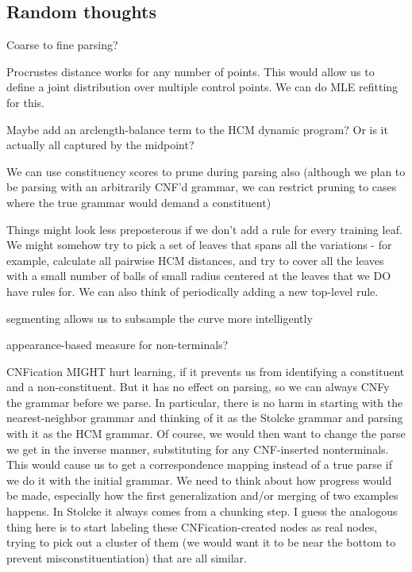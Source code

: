 \documentclass{article}
\begin{document}
\subsection{Random thoughts}
\bitem
\item Coarse to fine parsing?

\item Procrustes distance works for any number of points. This would
  allow us to define a joint distribution over multiple control
  points. We can do MLE refitting for this.

\item Maybe add an arclength-balance term to the HCM dynamic program? Or is
  it actually all captured by the midpoint?

\item We can use constituency scores to prune during parsing also
  (although we plan to be parsing with an arbitrarily CNF'd grammar,
  we can restrict pruning to cases where the true grammar would demand
  a constituent)

\item Things might look less preposterous if we don't add a rule for
  every training leaf. We might somehow try to pick a set of leaves
  that spans all the variations - for example, calculate all pairwise
  HCM distances, and try to cover all the leaves with a small number
  of balls of small radius centered at the leaves that we DO have
  rules for.  We can also think of periodically adding a new top-level
  rule.

\item segmenting allows us to subsample the curve more intelligently

\item appearance-based measure for non-terminals?  

\item CNFication MIGHT hurt learning, if it prevents us from
  identifying a constituent and a non-constituent. But it has no
  effect on parsing, so we can always CNFy the grammar before we
  parse. In particular, there is no harm in starting with the
  nearest-neighbor grammar and thinking of it as the Stolcke grammar
  and parsing with it as the HCM grammar. Of course, we would then
  want to change the parse we get in the inverse manner, substituting
  for any CNF-inserted nonterminals. This would cause us to get a
  correspondence mapping instead of a true parse if we do it with the
  initial grammar. We need to think about how progress would be made,
  especially how the first generalization and/or merging of two
  examples happens. In Stolcke it always comes from a chunking step. I
  guess the analogous thing here is to start labeling these
  CNFication-created nodes as real nodes, trying to pick out a cluster
  of them (we would want it to be near the bottom to prevent
  misconstituentiation) that are all similar.
\end{document}
